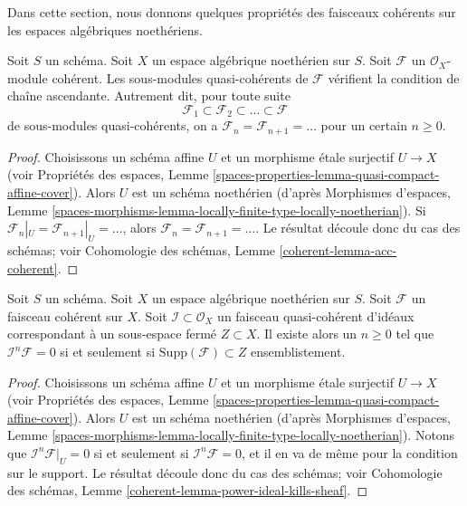 \noindent
Dans cette section, nous donnons quelques propriétés des faisceaux cohérents sur
les espaces algébriques noethériens.

\begin{lemma}
\label{lemma-acc-coherent}
Soit $S$ un schéma. Soit $X$ un espace algébrique noethérien sur $S$.
Soit $\mathcal{F}$ un $\mathcal{O}_X$-module cohérent.
Les sous-modules quasi-cohérents de $\mathcal{F}$ vérifient la condition
de chaîne ascendante. Autrement dit, pour toute suite
$$
\mathcal{F}_1 \subset \mathcal{F}_2 \subset \ldots \subset \mathcal{F}
$$
de sous-modules quasi-cohérents, on a
$\mathcal{F}_n = \mathcal{F}_{n + 1} = \ldots $ pour un certain $n \geq 0$.
\end{lemma}

\begin{proof}
Choisissons un schéma affine $U$ et un morphisme \'etale surjectif $U \to X$
(voir Propriétés des espaces, Lemme
\ref{spaces-properties-lemma-quasi-compact-affine-cover}).
Alors $U$ est un schéma noethérien (d'après
Morphismes d'espaces, Lemme
\ref{spaces-morphisms-lemma-locally-finite-type-locally-noetherian}).
Si $\mathcal{F}_n|_U = \mathcal{F}_{n + 1}|_U = \ldots$,
alors $\mathcal{F}_n = \mathcal{F}_{n + 1} = \ldots$.
Le résultat découle donc du cas des schémas; voir
Cohomologie des schémas, Lemme \ref{coherent-lemma-acc-coherent}.
\end{proof}

\begin{lemma}
\label{lemma-power-ideal-kills-sheaf}
Soit $S$ un schéma. Soit $X$ un espace algébrique noethérien sur $S$.
Soit $\mathcal{F}$ un faisceau cohérent sur $X$. Soit
$\mathcal{I} \subset \mathcal{O}_X$ un faisceau quasi-cohérent d'idéaux
correspondant à un sous-espace fermé $Z \subset X$. Il existe alors un
$n \geq 0$ tel que $\mathcal{I}^n\mathcal{F} = 0$ si et seulement si
$\text{Supp}(\mathcal{F}) \subset Z$ ensemblistement.
\end{lemma}

\begin{proof}
Choisissons un schéma affine $U$ et un morphisme \'etale surjectif $U \to X$
(voir Propriétés des espaces, Lemme
\ref{spaces-properties-lemma-quasi-compact-affine-cover}).
Alors $U$ est un schéma noethérien (d'après
Morphismes d'espaces, Lemme
\ref{spaces-morphisms-lemma-locally-finite-type-locally-noetherian}).
Notons que $\mathcal{I}^n\mathcal{F}|_U = 0$ si et seulement si
$\mathcal{I}^n\mathcal{F} = 0$, et il en va de même pour la condition sur
le support. Le résultat découle donc du cas des schémas; voir
Cohomologie des schémas, Lemme \ref{coherent-lemma-power-ideal-kills-sheaf}.
\end{proof}

